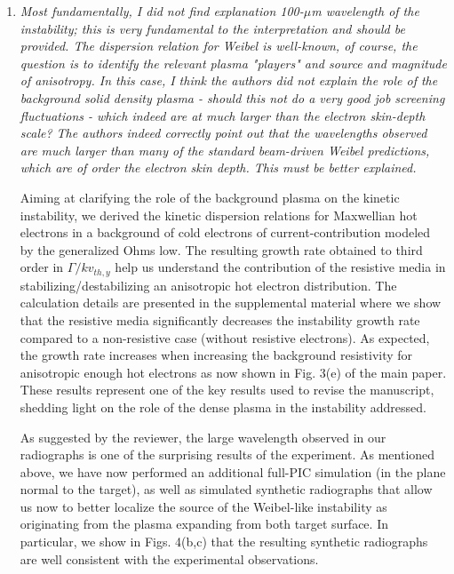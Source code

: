 \documentclass[aps,showpacs,superscriptaddress]{revtex4}%
\begin{document}
\begin{enumerate}
\item \textit{Most fundamentally, I did not find explanation 100-$\mu$m wavelength of the instability; this is very fundamental to the interpretation and should be provided. The dispersion relation for Weibel is well-known, of course, the question is to identify the relevant plasma "players" and source and magnitude of anisotropy. In this case, I think the authors did not explain the role of the background solid density plasma - should this not do a very good job screening fluctuations - which indeed are at much larger than the electron skin-depth scale? The authors indeed correctly point out that the wavelengths observed are much larger than many of the standard beam-driven Weibel predictions, which are of order the electron skin depth. This must be better explained. }

Aiming at clarifying the role of the background plasma on the kinetic instability,
we derived the kinetic dispersion relations for Maxwellian hot electrons in a background of cold electrons of current-contribution modeled by the generalized Ohms low. 
The resulting growth rate obtained to third order in $\Gamma/k v_{th,y}$ help us understand the contribution of the resistive media in stabilizing/destabilizing an anisotropic hot electron distribution. 
The calculation details are presented in the supplemental material where we show that the
resistive media significantly decreases the instability growth rate compared to a non-resistive case (without resistive electrons).
As expected, the growth rate increases when increasing the background resistivity for anisotropic enough hot electrons as now shown in Fig. 3(e) of the main paper.
These results represent one of the key results used to  revise the manuscript,  shedding light on the role of the dense plasma in the instability addressed.

As suggested by the reviewer,   the large wavelength observed in our radiographs is one of the surprising results of the  experiment. As mentioned above, we have now performed an additional full-PIC simulation (in the plane normal to the target), as well as simulated synthetic radiographs that allow us now to better localize the source of the Weibel-like instability as originating from the plasma expanding from both target surface. In particular, we show in Figs. 4(b,c) that the resulting synthetic radiographs are well consistent with the experimental observations. 


\end{enumerate}
\end{document}
